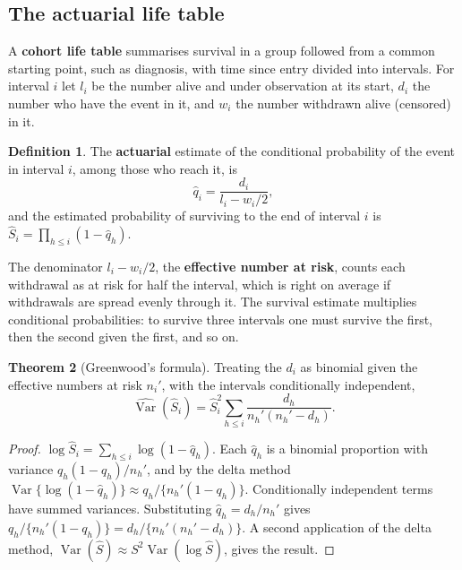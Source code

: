 \documentclass[11pt,a4paper]{article}
\numberwithin{equation}{section}
\DeclareMathOperator{\Var}{Var}
\theoremstyle{definition}
\newtheorem{thm}{Theorem}[subsection]
\newtheorem{defn}[thm]{Definition}
\begin{document}
\subsection{The actuarial life table}

A \textbf{cohort life table} summarises survival in a group followed from a common starting point, such as diagnosis, with time since
entry divided into intervals. For interval $i$ let $l_i$ be the number alive and under observation at its start, $d_i$ the number who have the
event in it, and $w_i$ the number withdrawn alive (censored) in it.

\begin{defn}
The \textbf{actuarial} estimate of the conditional probability of the event in interval $i$, among those who reach it, is
\[
\hat q_i = \frac{d_i}{l_i - w_i/2} ,
\]
and the estimated probability of surviving to the end of interval $i$ is $\hat S_i = \prod_{h \leq i}(1 - \hat q_h)$.
\end{defn}

The denominator $l_i - w_i/2$, the \textbf{effective number at risk}, counts each withdrawal as at risk for half the interval, which is right on
average if withdrawals are spread evenly through it. The survival estimate multiplies conditional probabilities: to survive three
intervals one must survive the first, then the second given the first, and so on.

\begin{thm}[Greenwood's formula]
\label{thm:greenwood}
Treating the $d_i$ as binomial given the effective numbers at risk $n_i'$, with the intervals conditionally independent,
\[
\widehat{\Var}(\hat S_i) = \hat S_i^2 \sum_{h \leq i} \frac{d_h}{n_h'(n_h' - d_h)} .
\]
\end{thm}

\begin{proof}
$\log\hat S_i = \sum_{h \leq i}\log(1 - \hat q_h)$. Each $\hat q_h$ is a binomial proportion with variance $q_h(1 - q_h)/n_h'$, and by the delta method
$\Var\{\log(1 - \hat q_h)\} \approx q_h/\{n_h'(1 - q_h)\}$. Conditionally independent terms have summed variances. Substituting $\hat q_h = d_h/n_h'$ gives
$q_h/\{n_h'(1 - q_h)\} = d_h/\{n_h'(n_h' - d_h)\}$. A second application of the delta method, $\Var(\hat S) \approx S^2\Var(\log\hat S)$, gives the result.
\end{proof}
\end{document}
